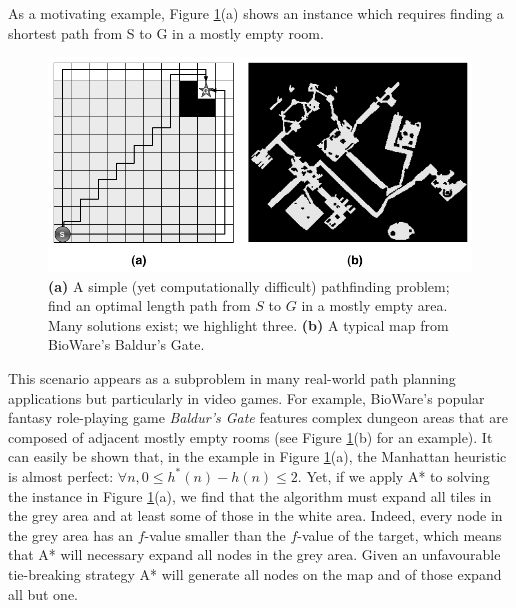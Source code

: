 As a motivating example, Figure \ref{fig-emptymap}(a) shows an instance
which requires finding a shortest path from S to G in a mostly empty room.
\begin{figure}[htbp]
	\vspace{-4pt}
       \begin{center}
                       \includegraphics[scale=0.30, trim = 20mm 20mm 20mm 0mm]{diagrams/emptymap.png}
       \end{center}
	\vspace{-3pt}
       \caption{\textbf{(a)} A simple (yet computationally difficult) pathfinding problem; find an 
optimal length path from $S$ to $G$ in a mostly empty area. 
Many solutions exist; we highlight three. 
\textbf{(b)} A typical map from BioWare's Baldur's Gate.}
       \label{fig-emptymap}
	\vspace{-12pt}
\end{figure}
This scenario appears as a subproblem in many real-world path planning applications but particularly
in video games.
For example, BioWare's popular fantasy role-playing game \emph{Baldur's Gate} features complex dungeon
 areas that are composed of adjacent mostly empty rooms (see Figure \ref{fig-emptymap}(b) for an example).
It can easily be shown that, in the example in Figure \ref{fig-emptymap}(a), the Manhattan heuristic is almost perfect: $\forall n, 0 \leq h^*(n) - h(n) \leq 2$.
Yet, if we apply A* \cite{hart68formal} to solving the instance in Figure \ref{fig-emptymap}(a), 
we find that the algorithm must expand all tiles in the grey 
area and at least some of those in the white area.
Indeed, every node in the grey area has an $f$-value smaller than the $f$-value of the target,
which means that A* will necessary expand all nodes in the grey area.
Given an unfavourable tie-breaking strategy A* will generate all nodes on the map and of those expand 
all but one.
\par
